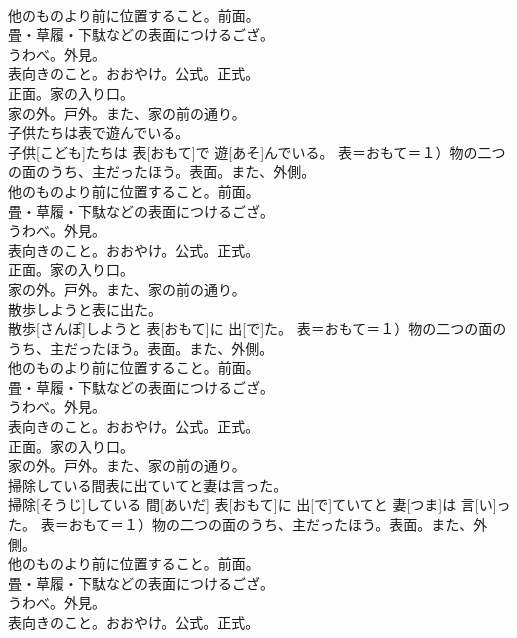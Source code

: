\documentclass[8pt]{extreport}
\begin{document}
\begin{CJK}{UTF8}{min}
{\\	他のものより前に位置すること。前面。 　　　　　　
\\	畳・草履・下駄などの表面につけるござ。 　　　　　　
\\	うわべ。外見。 　　　　　　
\\	表向きのこと。おおやけ。公式。正式。 　　　　　　
\\	正面。家の入り口。 　　　　　　
\\	家の外。戸外。また、家の前の通り。
\\	子供たちは表で遊んでいる。	
\\	子供[こども]たちは 表[おもて]で 遊[あそ]んでいる。	表＝おもて＝１）物の二つの面のうち、主だったほう。表面。また、外側。 　　　　　　
\\	他のものより前に位置すること。前面。 　　　　　　
\\	畳・草履・下駄などの表面につけるござ。 　　　　　　
\\	うわべ。外見。 　　　　　　
\\	表向きのこと。おおやけ。公式。正式。 　　　　　　
\\	正面。家の入り口。 　　　　　　
\\	家の外。戸外。また、家の前の通り。
\\	散歩しようと表に出た。	
\\	散歩[さんぽ]しようと 表[おもて]に 出[で]た。	表＝おもて＝１）物の二つの面のうち、主だったほう。表面。また、外側。 　　　　　　
\\	他のものより前に位置すること。前面。 　　　　　　
\\	畳・草履・下駄などの表面につけるござ。 　　　　　　
\\	うわべ。外見。 　　　　　　
\\	表向きのこと。おおやけ。公式。正式。 　　　　　　
\\	正面。家の入り口。 　　　　　　
\\	家の外。戸外。また、家の前の通り。
\\	掃除している間表に出ていてと妻は言った。	
\\	掃除[そうじ]している 間[あいだ] 表[おもて]に 出[で]ていてと 妻[つま]は 言[い]った。	表＝おもて＝１）物の二つの面のうち、主だったほう。表面。また、外側。 　　　　　　
\\	他のものより前に位置すること。前面。 　　　　　　
\\	畳・草履・下駄などの表面につけるござ。 　　　　　　
\\	うわべ。外見。 　　　　　　
\\	表向きのこと。おおやけ。公式。正式。 　　　　　　
}
\end{CJK}
\end{document}
